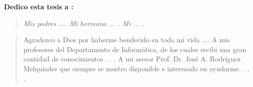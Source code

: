 \pagestyle{plain}
 
 {\bf\Large {Dedico esta tesis a :}}
 \vskip 1cm
\begin{quotation}
{\it Mis padres ....
\vskip 1cm
Mi hermano ... .
\vskip 1cm
Mi ... .}
\end{quotation}


\newpage

 {\bf\Large {}}
 \vskip 1.5cm
\begin{quotation}
Agradezco a Dios por haberme bendecido en toda mi vida ....
{\vskip 1cm}
A mis profesores del Departamento de Informática, de los cuales recibi una gran cantidad de conocimientos  . . .
\vskip 1cm
A mi asesor Prof. Dr. José A. Rodríguez Melquiades que siempre se mostro disponible e interesado en ayudarme.
\vskip 1cm
 . . .
 \end{quotation}
\newpage 
